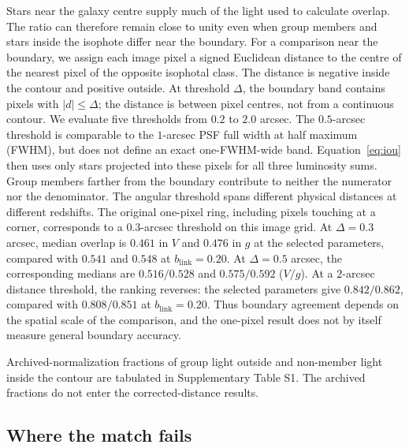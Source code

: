 \documentclass[usenatbib]{mnras}
\begin{document}
Stars near the galaxy centre supply much of the light used to calculate
overlap. The ratio can therefore remain close to unity even when group
members and stars inside the isophote differ near the boundary.
For a comparison near the boundary, we assign each image pixel a signed
Euclidean distance to the centre of the nearest pixel of the opposite
isophotal class. The distance is negative inside the contour and positive
outside. At threshold $\Delta$, the boundary band contains pixels with
$|d|\leq\Delta$; the distance is between pixel centres, not from a
continuous contour. We evaluate five thresholds from $0.2$ to $2.0$ arcsec.
The $0.5$-arcsec threshold is comparable to the $1$-arcsec PSF full width
at half maximum (FWHM), but does not define an exact one-FWHM-wide band.
Equation~\ref{eq:iou} then uses only stars projected into these pixels for
all three luminosity sums. Group members farther from the boundary
contribute to neither the numerator nor the denominator. The angular
threshold spans different physical distances at different redshifts. The
original one-pixel ring, including pixels touching at a corner, corresponds
to a $0.3$-arcsec threshold on this image grid. At $\Delta=0.3$ arcsec,
median overlap is $0.461$ in $V$ and $0.476$ in $g$ at
the selected parameters, compared with $0.541$ and $0.548$ at
$b_{\mathrm{link}}=0.20$. At $\Delta=0.5$ arcsec, the corresponding
medians are $0.516/0.528$ and
$0.575/0.592$ ($V/g$). At a $2$-arcsec distance threshold, the ranking reverses:
the selected parameters give $0.842/0.862$, compared with $0.808/0.851$
at $b_{\mathrm{link}}=0.20$. Thus boundary agreement depends on the
spatial scale of the comparison, and the one-pixel result does not by
itself measure general boundary accuracy.

Archived-normalization fractions of group light outside and non-member light inside the contour are tabulated in Supplementary Table S1. The archived fractions do not enter the corrected-distance results.

\subsection{Where the match fails}
\label{sec:fail}
\end{document}
